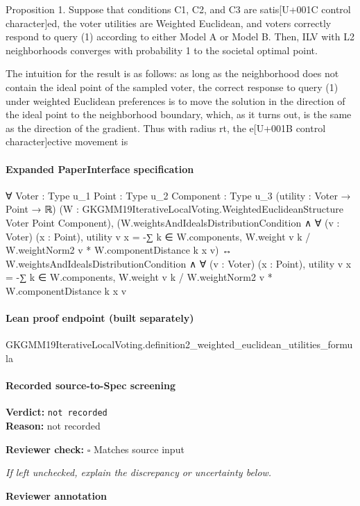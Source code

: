 \documentclass[10pt]{article}
\newcommand{\reviewerbox}{%
  \par\noindent\fbox{\parbox{0.96\linewidth}{\rule{0pt}{0.38in}}}\par
}
\newcommand{\reviewmatch}[1]{%
  \par\noindent\textbf{Reviewer check:} $\square$\; #1\par
  \noindent\emph{If left unchecked, explain the discrepancy or uncertainty below.}\par
}
\begin{document}
\begin{ReviewVerbatim}
Proposition 1. Suppose that conditions C1, C2, and C3 are satis[U+001C control character]ed, the voter utilities are
Weighted Euclidean, and voters correctly respond to query (1) according to either Model A
or Model B. Then, ILV with L2 neighborhoods converges with probability 1 to the societal
optimal point.

The intuition for the result is as follows: as long as the neighborhood does not contain
the ideal point of the sampled voter, the correct response to query (1) under weighted
Euclidean preferences is to move the solution in the direction of the ideal point to the
neighborhood boundary, which, as it turns out, is the same as the direction of the gradient.
Thus with radius rt, the e[U+001B control character]ective movement is
\end{ReviewVerbatim}


\paragraph{Expanded PaperInterface specification}
\begin{ReviewVerbatim}
∀ {Voter : Type u_1} {Point : Type u_2} {Component : Type u_3} (utility : Voter → Point → ℝ)
  (W : GKGMM19IterativeLocalVoting.WeightedEuclideanStructure Voter Point Component),
  (W.weightsAndIdealsDistributionCondition ∧
      ∀ (v : Voter) (x : Point),
        utility v x = -∑ k ∈ W.components, W.weight v k / W.weightNorm2 v * W.componentDistance k x v) ↔
    W.weightsAndIdealsDistributionCondition ∧
      ∀ (v : Voter) (x : Point),
        utility v x = -∑ k ∈ W.components, W.weight v k / W.weightNorm2 v * W.componentDistance k x v
\end{ReviewVerbatim}

\paragraph{Lean proof endpoint (built separately)}\begin{ReviewVerbatim}
GKGMM19IterativeLocalVoting.definition2_weighted_euclidean_utilities_formula
\end{ReviewVerbatim}

\paragraph{Recorded source-to-Spec screening}
\textbf{Verdict:} \texttt{not recorded}
\\
\textbf{Reason:} not recorded
\reviewmatch{Matches source input}
\noindent\textbf{Reviewer annotation}\par
\reviewerbox
\clearpage
\hypertarget{source-claim-a8574105e720bec5}{}
\end{document}
